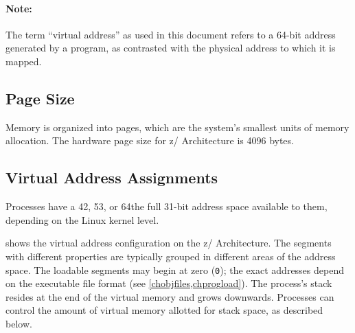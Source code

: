 \documentclass[USenglish,fontsize=11pt,twoside,%
  toc=bib,toc=idx,toc=graduated,numbers=noendperiod,
  bookmarks=true,
  bookmarksnumbered=true,
  bookmarksopen=true,
  bookmarksopenlevel=1,
  breaklinks=true,
  colorlinks=true,
  linkcolor=black,
  pdfpagelayout={TwoPageRight},
  pdfusetitle=true
]{scrreprt}
\newcommand{\ADDRBITS}{64}
\newcommand{\ARCH}{z/\kern-1pt Ar\-chi\-tec\-ture}
\newcommand{\ARCHarch}{\ARCH}
\newcommand{\theARCH}{the \ARCH}
\newcommand{\ADDRBITS}{31}
\newcommand{\ARCH}{ESA/390}
\newcommand{\ARCHarch}{the \ARCH{} ar\-chi\-tec\-ture}
\newcommand{\theARCH}{\ARCHarch}
\begin{document}
\paragraph{Note:}
The term ``virtual address'' as used in this document refers to a
\ADDRBITS{}-bit address generated by a program, as
contrasted with the physical address to which it is mapped.

\subsection{Page Size}
Memory is organized into pages, which are the system's smallest units
of memory allocation.  The hardware page size for \ARCHarch{}
is 4096 bytes.

\subsection{Virtual Address Assignments}
Processes have {\ifzseries a 42, 53, or 64\else the full 31\fi}-bit
address space available to them{\ifzseries, depending on the Linux
  kernel level\fi}.

 shows the virtual address configuration on \theARCH{}.
The segments with different properties are typically
grouped in different areas of the address space.  The loadable segments
may begin at zero (\texttt{0}); the exact addresses depend on the
executable file format (see \cref{chobjfiles,chprogload}).  The process's
stack resides at the end of the virtual memory and grows downwards.
Processes can control the amount of virtual memory allotted for stack
space, as described below.
\end{document}
